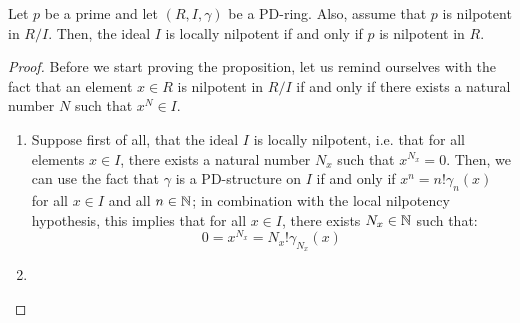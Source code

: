                 \begin{proposition} \label{prop: p_powers_in_PD_rings}
                    Let $p$ be a prime and let $(R, I , \gamma)$ be a PD-ring. Also, assume that $p$ is nilpotent in $R/I$. Then, the ideal $I$ is locally nilpotent if and only if $p$ is nilpotent in $R$. 
                \end{proposition}
                    \begin{proof}
                        Before we start proving the proposition, let us remind ourselves with the fact that an element $x \in R$ is nilpotent in $R/I$ if and only if there exists a natural number $N$ such that $x^N \in I$. 
                        \begin{enumerate}
                            \item Suppose first of all, that the ideal $I$ is locally nilpotent, i.e. that for all elements $x \in I$, there exists a natural number $N_x$ such that $x^{N_x} = 0$. Then, we can use the fact that $\gamma$ is a PD-structure on $I$ if and only if $x^n = n!\gamma_n(x)$ for all $x \in I$ and all $n \in \mathbb{N}$; in combination with the local nilpotency hypothesis, this implies that for all $x \in I$, there exists $N_x \in \mathbb{N}$ such that:
                                $$0 = x^{N_x} = N_x!\gamma_{N_x}(x)$$
                            \item
                        \end{enumerate}
                    \end{proof}
                    
